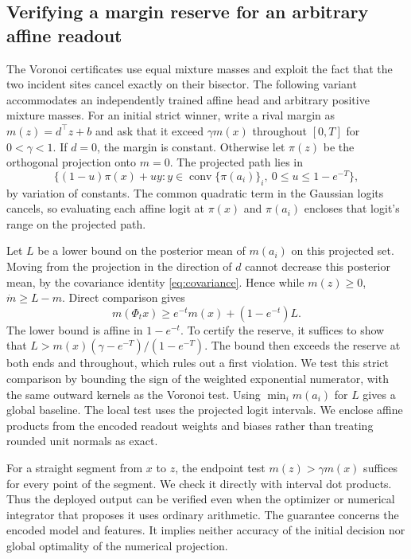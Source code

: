 \subsection{Verifying a margin reserve for an arbitrary affine readout}
\label{sec:reserve-verification}

The Voronoi certificates use equal mixture masses and exploit the
fact that the two incident sites cancel exactly on their bisector.
The following variant accommodates an independently trained affine
head and arbitrary positive mixture masses. For an initial strict
winner, write a rival margin as $m(z)=d^\top z+b$ and ask that it
exceed $\gamma m(x)$ throughout $[0,T]$ for $0<\gamma<1$.
If $d=0$, the margin is constant. Otherwise let $\pi(z)$ be the
orthogonal projection onto $m=0$. The projected path lies in
\[
  \{(1-u)\pi(x)+uy: y\in\operatorname{conv}\{\pi(a_i)\}_i,
        \ 0\le u\le 1-e^{-T}\},
\]
by variation of constants. The common quadratic term in the Gaussian
logits cancels, so evaluating each affine logit at $\pi(x)$ and
$\pi(a_i)$ encloses that logit's range on the projected path.

Let $L$ be a lower bound on the posterior mean of $m(a_i)$ on this
projected set. Moving from the projection in the direction of $d$
cannot decrease this posterior mean, by the covariance identity
\eqref{eq:covariance}. Hence while $m(z)\ge0$,
$\dot m\ge L-m$. Direct comparison gives
\[
  m(\Phi_t x)\ge e^{-t}m(x)+(1-e^{-t})L.
\]
The lower bound is affine in $1-e^{-t}$. To certify the reserve, it
suffices to show that $L>m(x)(\gamma-e^{-T})/(1-e^{-T})$. The bound then
exceeds the reserve at both ends and throughout, which rules out a
first violation. We test this strict comparison by bounding the
sign of the weighted exponential numerator, with the same outward
kernels as the Voronoi test. Using $\min_i m(a_i)$ for $L$ gives a
global baseline. The local test uses the projected logit intervals.
We enclose affine products from the encoded readout weights and biases
rather than treating rounded unit normals as exact.

For a straight segment from $x$ to $z$, the endpoint test
$m(z)>\gamma m(x)$ suffices for every point of the segment. We check
it directly with interval dot products. Thus the deployed output can
be verified even when the optimizer or numerical integrator that
proposes it uses ordinary arithmetic. The guarantee concerns the
encoded model and features. It implies neither accuracy of the initial
decision nor global optimality of the numerical projection.
